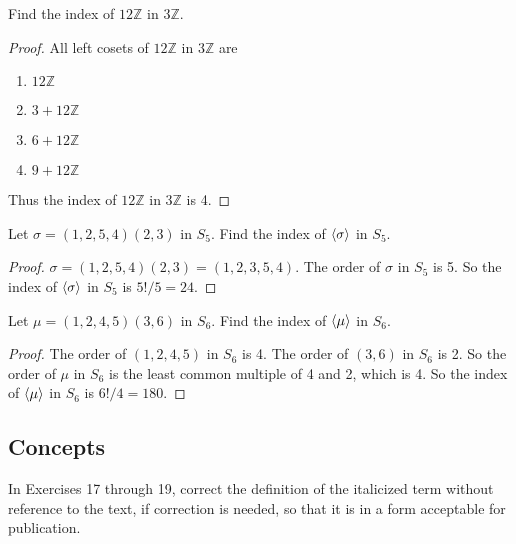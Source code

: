 \begin{exercise}
    Find the index of $12\mathbb{Z}$ in $3\mathbb{Z}$.
\end{exercise}

\begin{proof}
    All left cosets of $12\mathbb{Z}$ in $3\mathbb{Z}$ are
    \begin{enumerate}[label={(\arabic*)}]
        \item $12\mathbb{Z}$
        \item $3 + 12\mathbb{Z}$
        \item $6 + 12\mathbb{Z}$
        \item $9 + 12\mathbb{Z}$
    \end{enumerate}

    Thus the index of $12\mathbb{Z}$ in $3\mathbb{Z}$ is 4.
\end{proof}

\begin{exercise}
    Let $\sigma = (1,2,5,4)(2,3)$ in $S_{5}$. Find the index of $\left\langle{\sigma}\right\rangle$ in $S_{5}$.
\end{exercise}

\begin{proof}
    $\sigma = (1,2,5,4)(2,3) = (1,2,3,5,4)$. The order of $\sigma$ in $S_{5}$ is 5. So the index of $\left\langle{\sigma}\right\rangle$ in $S_{5}$ is $5!/5 = 24$.
\end{proof}

\begin{exercise}
    Let $\mu = (1,2,4,5)(3,6)$ in $S_{6}$. Find the index of $\left\langle{\mu}\right\rangle$ in $S_{6}$.
\end{exercise}

\begin{proof}
    The order of $(1,2,4,5)$ in $S_{6}$ is 4. The order of $(3,6)$ in $S_{6}$ is 2. So the order of $\mu$ in $S_{6}$ is the least common multiple of 4 and 2, which is 4. So the index of $\left\langle{\mu}\right\rangle$ in $S_{6}$ is $6!/4 = 180$.
\end{proof}

\subsection*{Concepts}

In Exercises 17 through 19, correct the definition of the italicized term without reference to the text, if correction is needed, so that it is in a form acceptable for publication.


